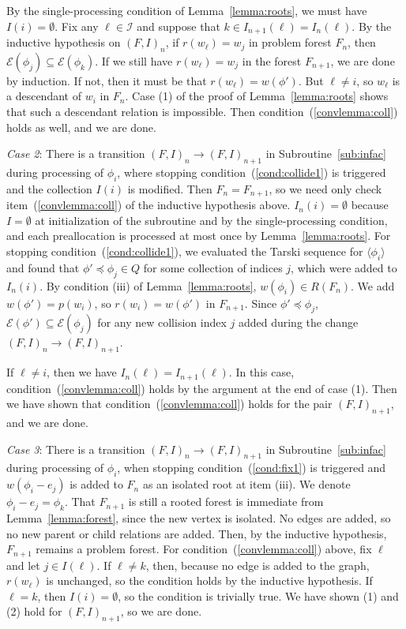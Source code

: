 \documentclass[11pt,reqno]{amsart}
\theoremstyle{definition}
\numberwithin{equation}{section}
\newcommand{\lag}{\langle}
\newcommand{\rag}{\rangle}
\newcommand{\pre}{\phi}
\newcommand{\sub}{\subseteq}
\newcommand{\fix}{\mathcal{E}}
\newcommand{\peq}{\preceq}
\newcommand{\act}{Q}
\newcommand{\coll}{I}
\newcommand{\forest}{F}
\newcommand{\pair}{(F,I)}
\newcommand{\roott}{R}
\newcommand{\infacstoptwiii}{(iii)\xspace}
\begin{document}
By the single-processing condition of Lemma~\ref{lemma:roots}, we must have $\coll(i) = \emptyset$.
Fix any $\ell \in \mathcal{I}$ and suppose that $k \in \coll_{n+1}(\ell) = \coll_{n}(\ell)$. 
By the inductive hypothesis on $\pair_n$, if $r(w_{\ell}) = w_j$ in problem forest $\forest_n$, then $\fix(\pre_j) \sub \fix(\pre_k)$. 
If we still have $r(w_{\ell}) = w_j$ in the forest $\forest_{n+1}$, we are done by induction. 
If not, then it must be that $r(w_{\ell}) = w(\pre')$. 
But $\ell \not = i$, so $w_{\ell}$ is a descendant of $w_i$ in $\forest_n$.
Case (1) of the proof of Lemma~\ref{lemma:roots} shows that such a descendant relation is impossible. 
Then condition~(\ref{convlemma:coll}) holds as well, and we are done.

\emph{Case 2}: There is a transition $\pair_n \to \pair_{n +1}$ in Subroutine~\ref{sub:infac} during processing of $\pre_i$, where stopping condition~(\ref{cond:collide1}) is triggered and the collection $\coll(i)$ is modified.
Then $\forest_n = \forest_{n + 1}$, so we need only check item~(\ref{convlemma:coll}) of the inductive hypothesis above.
$\coll_n(i) = \emptyset$ because $I = \emptyset$ at initialization of the subroutine and by the single-processing condition, and each preallocation is processed at most once by Lemma~\ref{lemma:roots}. %
For stopping condition~(\ref{cond:collide1}), we evaluated the Tarski sequence for $\lag \pre_i \rag$ and found that $\pre' \peq \pre_j \in \act$ for some collection of indices $j$, which were added to $I_n(i)$.
By condition (iii) of Lemma~\ref{lemma:roots}, $w(\pre_i) \in \roott(\forest_n)$. 
We add $w(\pre') = p(w_i)$, so $r(w_i) = w(\pre')$ in $\forest_{n+1}$. 
Since $\pre' \peq \pre_j$, $\fix(\pre') \sub \fix(\pre_j)$ for any new collision index $j$ added during the change $\pair_n \to \pair_{n+1}$.

If $\ell \not = i$, then we have $\coll_n(\ell) = \coll_{n + 1}(\ell)$. 
In this case, condition~(\ref{convlemma:coll}) holds by the argument at the end of case (1).
Then we have shown that condition~(\ref{convlemma:coll}) holds for the pair $\pair_{n + 1}$, and we are done. 

\emph{Case 3}: There is a transition $\pair_n \to \pair_{n +1}$ in Subroutine~\ref{sub:infac} during processing of $\pre_i$, when stopping condition~(\ref{cond:fix1}) is triggered and $w(\pre_i - e_j)$ is added to $\forest_n$ as an isolated root at item \infacstoptwiii. 
We denote $\pre_i - e_j = \pre_k$.
That $\forest_{n + 1}$ is still a rooted forest is immediate from Lemma~\ref{lemma:forest}, since the new vertex is isolated.
No edges are added, so no new parent or child relations are added. 
Then, by the inductive hypothesis, $\forest_{n + 1}$ remains a problem forest.
For condition~(\ref{convlemma:coll}) above, fix $\ell$ and let $j \in \coll(\ell)$.
If $\ell \not = k$, then, because no edge is added to the graph, $r(w_{\ell})$ is unchanged, so the condition holds by the inductive hypothesis. 
If $\ell = k$, then $\coll(i) = \emptyset$, so the condition is trivially true. 
We have shown (1) and (2) hold for $\pair_{n + 1}$, so we are done.
\end{document}
